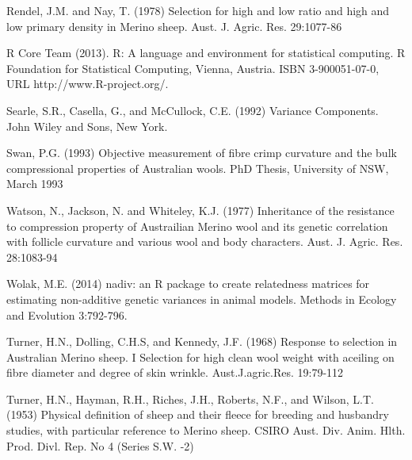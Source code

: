 \documentclass[titlepage]{article}  %
\begin{document}
\begin{thebibliography}{99}
Rendel, J.M. and Nay, T. (1978) Selection for high and low ratio and high 
    and low primary density in Merino sheep. 
    Aust. J. Agric. Res. 29:1077-86

R Core Team (2013). R: A language and environment for statistical
  computing. R Foundation for Statistical Computing, Vienna, Austria.
  ISBN 3-900051-07-0, URL http://www.R-project.org/.

Searle, S.R., Casella, G., and McCullock, C.E. (1992) Variance Components.
    John Wiley and Sons, New York.


Swan, P.G. (1993) Objective measurement of fibre crimp curvature and the bulk compressional properties of Australian wools. PhD Thesis, University of NSW, March 1993 

Watson, N., Jackson, N. and Whiteley, K.J. (1977) Inheritance of the resistance
    to compression property of Austrailian Merino wool and its genetic 
    correlation with follicle curvature and various wool and body 
    characters. Aust. J. Agric. Res. 28:1083-94

Wolak, M.E. (2014) nadiv: an R package to create relatedness matrices for
    estimating non-additive genetic variances in animal models.
    Methods in Ecology and Evolution 3:792-796.

Turner, H.N., Dolling, C.H.S, and Kennedy, J.F. (1968) Response to selection in Australian Merino sheep. I Selection for high clean wool weight with aceiling on fibre diameter and degree of skin wrinkle. Aust.J.agric.Res. 19:79-112

Turner, H.N., Hayman, R.H., Riches, J.H., Roberts, N.F., and Wilson, L.T. (1953) Physical definition of sheep and their fleece for breeding and husbandry studies, with particular reference to Merino sheep. CSIRO Aust. Div. Anim. Hlth. Prod. Divl. Rep. No 4 (Series S.W. -2)

\end{thebibliography}
\end{document}
